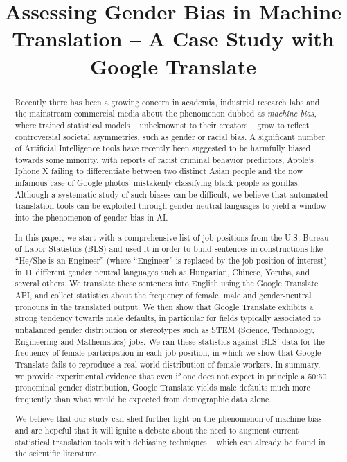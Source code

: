 \documentclass[fleqn,10pt]{article}
\title{Assessing Gender Bias in Machine Translation -- A Case Study with Google Translate}
\begin{document}
\newif\ifchanged
\changedtrue
{}
\DeclareRobustCommand{\changess}[1]{\ifchanged{\hl{#1}}\else{#1 }\fi}
\DeclareRobustCommand{\changess}[1]{\ifthenelse{\boolean{mark}}{\hl{#1}}{#1}}

\maketitle

\begin{abstract}
Recently there has been a growing concern in academia, industrial research labs and the mainstream commercial media about the phenomenon dubbed as \emph{machine bias}, where trained statistical models -- unbeknownst to their creators -- grow to reflect controversial societal asymmetries, such as gender or racial bias. A significant number of Artificial Intelligence tools have recently been suggested to be harmfully biased towards some minority, with reports of racist criminal behavior predictors, Apple's Iphone X failing to differentiate between two distinct Asian people and the now infamous case of Google photos' mistakenly classifying black people as gorillas. Although a systematic study of such biases can be difficult, we believe that automated translation tools can be exploited through gender neutral languages to yield a window into the phenomenon of gender bias in AI.

In this paper,  we start with a comprehensive list of job positions from the U.S. Bureau of Labor Statistics (BLS) and used it in order to build sentences in constructions like ``He/She is an Engineer'' (where ``Engineer'' is replaced by the job position of interest) in 11 different gender neutral languages such as Hungarian, Chinese, Yoruba, and several others. We translate these sentences into English using the Google Translate API, and collect statistics about the frequency of female, male and gender-neutral pronouns in the translated output. We then show that Google Translate exhibits a strong tendency towards male defaults,  in particular for fields typically associated to unbalanced gender distribution or  stereotypes such as STEM (Science, Technology, Engineering and Mathematics) jobs. We ran these statistics against BLS' data for the frequency of female participation in each job position, in which we show that Google Translate fails to reproduce a real-world distribution of female workers. In summary, we provide experimental evidence that even if one does not expect in principle a 50:50 pronominal gender distribution, Google Translate yields male defaults much more frequently than what would be expected from demographic data alone.

We believe that our study can shed further light on the phenomenon of machine bias and are hopeful that it will ignite a debate about the need to augment current statistical translation tools with debiasing techniques -- which can already be found in the scientific literature.
\end{abstract}
\end{document}
